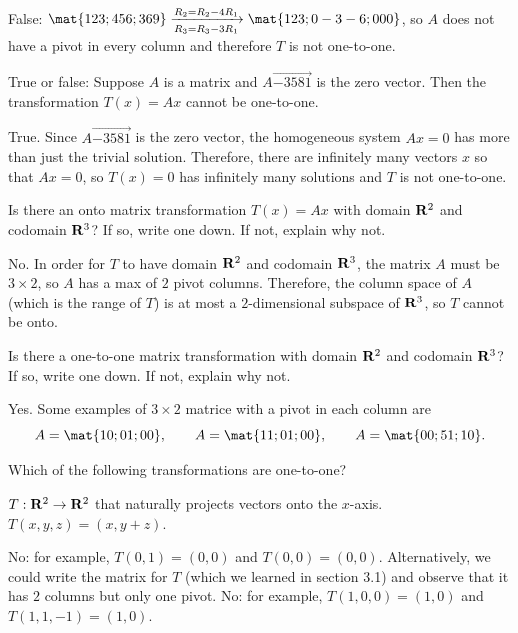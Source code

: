 \begin{problems}
\begin{solution}
False:
    $\mat{1 2 3; 4 5 6; 3 6 9} \xrightarrow[R_3 = R_3 - 3R_1]{R_2=
      R_2-4R_1} \mat{1 2 3; 0 -3 -6; 0 0 0}$, so $A$ does not have a
    pivot in every column and therefore $T$ is not one-to-one.
\end{solution}

\problem True or false: Suppose $A$ is
a matrix and $A \vec{-3 5 8 1}$ is the zero vector.  Then the transformation
$T(x) = Ax$ cannot be one-to-one.

\begin{solution}
  True.  Since $A \vec{-3 5 8 1}$ is the zero vector, the homogeneous
  system $Ax = 0$ has more than just the trivial solution.  Therefore, 
  there are infinitely many vectors $x$ so that $Ax = 0$, so $T(x)=0$
  has infinitely many solutions and $T$ is not one-to-one.
\end{solution}

\problem %
Is there an onto matrix transformation $T(x) = Ax$ with domain ${\bf R}^2$ and
codomain ${\bf R}^3$?  If so, write one down.  If not, explain why not.

\begin{solution}
  No.  In order for $T$ to have domain ${\bf R}^2$ and codomain ${\bf R}^3$, the
  matrix $A$ must be $3 \times 2$, so $A$ has a max of $2$ pivot columns.
  Therefore, the column space of $A$ (which is the range of $T$) is at most a
  $2$-dimensional subspace of ${\bf R}^3$, so $T$ cannot be onto.
\end{solution}

\problem %
Is there a one-to-one matrix transformation with domain ${\bf R}^2$ and codomain
${\bf R}^3$?  If so, write one down.  If not, explain why not.

\begin{solution}
Yes.  Some examples of $3 \times 2$ matrice with a pivot in each column are
\[A = \mat{1 0; 0 1; 0 0}, \qquad A = \mat{1 1; 0 1; 0 0}, 
\qquad A = \mat{0 0; 5 1; 1 0}.\]
\end{solution}



\problem Which of the following transformations are one-to-one?
\begin{subproblems}
  \subproblem $T: {\bf R}^2 \to {\bf R}^2$ that naturally projects
  vectors onto the $x$-axis. %
  \subproblem $T(x, y, z) = (x, y+z)$.
\end{subproblems}

\begin{solution}
  \begin{subproblems}
    \subproblem No: for example, $T(0, 1) = (0, 0)$ and
    $T(0, 0) = (0, 0)$. Alternatively, we could write the matrix for
    $T$ (which we learned in section 3.1) and observe that it has $2$
    columns but only one pivot.%
    \subproblem No: for example, $T(1, 0, 0) = (1, 0)$ and
    $T(1, 1, -1) = (1, 0)$. %
  \end{subproblems}
\end{solution}


\end{problems}
